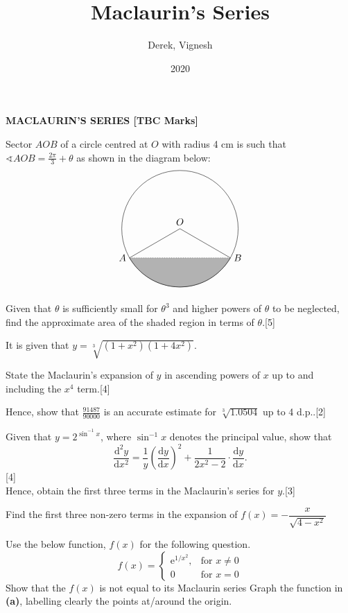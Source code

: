 \documentclass[12pt, a4 paper]{article}
\title{Maclaurin's Series}
\author{Derek, Vignesh}
\date{2020}
\begin{document}
\maketitle

\textbf{MACLAURIN'S SERIES [TBC Marks]}
\begin{outline}[enumerate]
 \1 Sector $AOB$ of a circle centred at $O$ with radius 4 cm is such that $\sphericalangle AOB = \frac{2\pi}{3}+\theta$ as shown in the diagram below: %
 \[
  \begin{tikzpicture}
   \draw (0,0) node[above]{$O$} circle (60pt);
   \draw (-51.96152pt,-30pt) node[left]{$A$} -- (0,0);
   \draw (51.96152pt,-30pt) node[right]{$B$} -- (0,0);
   \filldraw[color=white!70!black,draw=black] (-51.96152pt,-30pt) arc (210:330:60pt);
   \draw[dotted](-51.96152pt,-30pt) -- (51.96152pt,-30pt);
  \end{tikzpicture}
 \]
 Given that $\theta$ is sufficiently small for $\theta^3$ and higher powers of $\theta$ to be neglected, find the approximate area of the shaded region in terms of $\theta$.\hfill[5]

 \1 It is given that $y=\sqrt[3]{(1+x^2)(1+4x^2)}$. %

 \2 State the Maclaurin's expansion of $y$ in ascending powers of $x$ up to and including the $x^4$ term.\hfill[4]

 \2 Hence, show that $\frac{91487}{90000}$ is an accurate estimate for $\sqrt[3]{1.0504}$  up to 4 d.p..\hfill[2]

 \1 Given that $y=2^{\sin^{-1}{x}}$, where $\sin^{-1}{x}$ denotes the principal value, show that
 \begin{equation*}
    \dfrac{\mathrm{d}^2y}{\mathrm{d}x^2}=\dfrac{1}{y}\left(\dfrac{\mathrm{d}y}{\mathrm{d}x}\right)^2+\dfrac{1}{2x^2-2}\cdot \dfrac{\mathrm{d}y}{\mathrm{d}x}.
 \end{equation*}\hfill[4] \\
 Hence, obtain the first three terms in the Maclaurin's series for $y$.\hfill[3] %

 \1 Find the first three non-zero terms in the expansion of $f(x)=-\dfrac{x}{\sqrt{4-x^2}}$ %

 \1 Use the below function, $f(x)$ for the following question. %
 \begin{equation*}
  f(x) = \begin{cases}
   \mathrm{e}^{1/x^2}, & \textrm{for }  x\neq0 \\
   0                   & \textrm{for } x=0
  \end{cases}
 \end{equation*}
 \2 Show that the $f(x)$ is not equal to its Maclaurin series
 \2 Graph the function in \textbf{(a)}, labelling clearly the points at/around the origin.


\end{outline}
\end{document}
